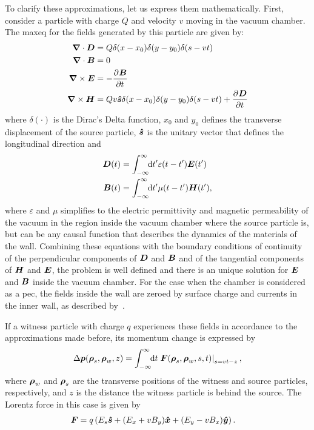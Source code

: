     To clarify these approximations, let us express them mathematically. First, consider a particle with charge $Q$ and velocity $v$  moving in the vacuum chamber. The \gls{maxeq} for the fields generated by this particle are given by:
    \begin{align}\label{eq:maxeq}
	  	\nonumber
      	\boldsymbol{\nabla}\cdot\boldsymbol{D} &= Q\delta(x-x_0)\delta(y-y_0)\delta(s-vt)\\ \nonumber
	  	\boldsymbol{\nabla}\cdot\boldsymbol{B} &= 0\\
	  	\boldsymbol{\nabla}\times\boldsymbol{E} &= -\frac{\partial^{{}}\boldsymbol{B}}{\partial t^{{}}}\\
	  	\nonumber
	  	\boldsymbol{\nabla}\times\boldsymbol{H} &= Qv\boldsymbol{\hat s}\delta(x-x_0)\delta(y-y_0)\delta(s-vt) + 		\frac{\partial^{{}}\boldsymbol{D}}{\partial t^{{}}}
    \end{align}
    where $\delta(\cdot)$ is the Dirac's Delta function, $x_0$ and $y_0$ defines the transverse displacement of the source particle, $\boldsymbol{\hat s}$ is the unitary vector that defines the longitudinal direction and
    \begin{align}
  	  	\boldsymbol{D}(t) &= \int_{-\infty}^{\infty}\!\!\text{d}t' \varepsilon(t-t')\boldsymbol{E}(t')\\
	  	\boldsymbol{B}(t) &= \int_{-\infty}^{\infty}\!\!\text{d}t' \mu(t-t')\boldsymbol{H}(t'),
    \end{align}
    where $\varepsilon$ and $\mu$ simplifies to the electric permittivity and magnetic permeability of the vacuum in the region inside the vacuum chamber where the source particle is, but can be any causal function that describes the dynamics of the materials of the wall. Combining these equations with the boundary conditions of continuity of the perpendicular components of $\boldsymbol{D}$ and $\boldsymbol{B}$ and of the tangential components of $\boldsymbol{H}$ and $\boldsymbol{E}$, the problem is well defined and there is an unique solution for $\boldsymbol{E}$ and $\boldsymbol{B}$ inside the vacuum chamber. For the case when the chamber is considered as a \gls{pec}, the fields inside the wall are zeroed by surface charge and currents in the inner wall, as described by~.

    If a witness particle with charge $q$ experiences these fields in accordance to the approximations made before, its momentum change is expressed by
    \begin{align}\label{eq:momentum_gain}
  	  	\Delta \boldsymbol{p}(\boldsymbol{\rho}_s, \boldsymbol{\rho}_w, z) = \int_{-\infty}^{\infty}\!\!\text{d}t \left.\boldsymbol{F}(\boldsymbol{\rho}_s, \boldsymbol{\rho}_w, s, t)\right|_{s=vt-z},
    \end{align}
    where $\boldsymbol{\rho}_w$ and $\boldsymbol{\rho}_s$ are the transverse positions of the witness and source particles, respectively, and $z$ is the distance the witness particle is behind the source. The Lorentz force in this case is given by
    \begin{align}\label{eq:lorentz_force}
  	  	\boldsymbol{F} &= q\left(E_s\boldsymbol{\hat s} + (E_x+vB_y)\boldsymbol{\hat x} + (E_y-vB_x)\boldsymbol{\hat y}\right).
    \end{align}

